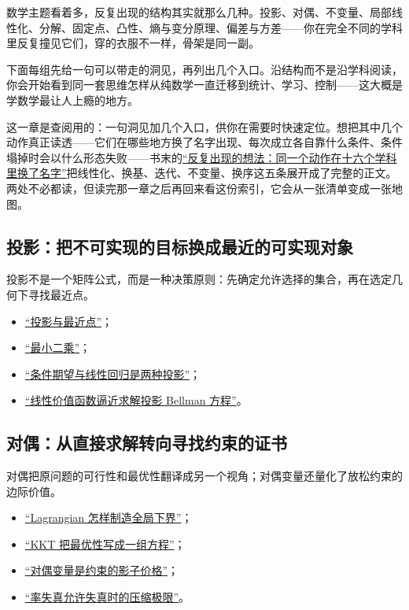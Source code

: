 数学主题看着多，反复出现的结构其实就那么几种。投影、对偶、不变量、局部线性化、分解、固定点、凸性、熵与变分原理、偏差与方差——你在完全不同的学科里反复撞见它们，穿的衣服不一样，骨架是同一副。

下面每组先给一句可以带走的洞见，再列出几个入口。沿结构而不是沿学科阅读，你会开始看到同一套思维怎样从纯数学一直迁移到统计、学习、控制——这大概是学数学最让人上瘾的地方。

这一章是查阅用的：一句洞见加几个入口，供你在需要时快速定位。想把其中几个动作真正读透——它们在哪些地方换了名字出现、每次成立各自靠什么条件、条件塌掉时会以什么形态失败——书末的\hyperref[ch:145]{``反复出现的想法：同一个动作在十六个学科里换了名字''}把线性化、换基、迭代、不变量、换序这五条展开成了完整的正文。两处不必都读，但读完那一章之后再回来看这份索引，它会从一张清单变成一张地图。

\subsection{投影：把不可实现的目标换成最近的可实现对象}

投影不是一个矩阵公式，而是一种决策原则：先确定允许选择的集合，再在选定几何下寻找最近点。

\begin{itemize}
\tightlist
\item \hyperref[sec:03-Linear-Algebra/03-Orthogonality/02]{``投影与最近点''}；
\item \hyperref[sec:03-Linear-Algebra/03-Orthogonality/03]{``最小二乘''}；
\item \hyperref[sec:12-Real-Analysis-Support/07-Lp-Spaces-and-Function-Geometry/04]{``条件期望与线性回归是两种投影''}；
\item \hyperref[sec:16-Control-and-Reinforcement-Learning/02-Reinforcement-Learning/05]{``线性价值函数逼近求解投影 Bellman 方程''}。
\end{itemize}

\subsection{对偶：从直接求解转向寻找约束的证书}

对偶把原问题的可行性和最优性翻译成另一个视角；对偶变量还量化了放松约束的边际价值。

\begin{itemize}
\tightlist
\item \hyperref[sec:09-Convex-Optimization/05-Duality/01]{``Lagrangian 怎样制造全局下界''}；
\item \hyperref[sec:09-Convex-Optimization/05-Duality/03]{``KKT 把最优性写成一组方程''}；
\item \hyperref[sec:09-Convex-Optimization/05-Duality/04]{``对偶变量是约束的影子价格''}；
\item \hyperref[sec:07-Information-Theory/04-Source-Coding/05]{``率失真允许失真时的压缩极限''}。
\end{itemize}

